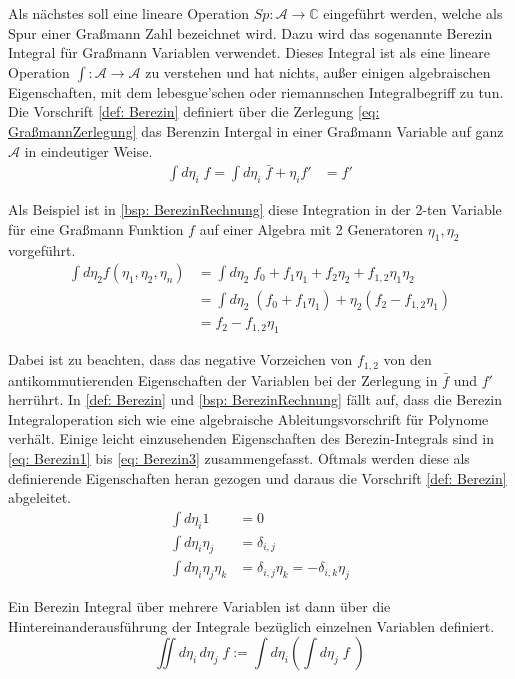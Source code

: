 Als nächstes soll eine lineare Operation $\textit{Sp}:\mathcal A \rightarrow \mathbb C$ eingeführt werden, welche als Spur einer Graßmann Zahl bezeichnet wird. Dazu wird das sogenannte Berezin Integral für Graßmann Variablen verwendet. Dieses Integral ist als eine lineare Operation $\int: \mathcal A \rightarrow \mathcal A$ zu verstehen und hat nichts, außer einigen algebraischen Eigenschaften, mit dem lebesgue'schen oder riemannschen Integralbegriff zu tun. Die Vorschrift \eqref{def: Berezin} definiert über die Zerlegung \eqref{eq: GraßmannZerlegung} das Berenzin Intergal in einer Graßmann Variable auf ganz $\mathcal A$ in eindeutiger Weise.
\begin{align} 
\int d \eta_i \; f = \int d \eta_i \; \bar{f} + \eta_i f' &= f' \label{def: Berezin}
\end{align}

\noindent Als Beispiel ist in \eqref{bsp: BerezinRechnung} diese Integration in der 2-ten Variable für eine Graßmann Funktion $f$ auf einer Algebra mit 2 Generatoren $\eta_1, \eta_2$ vorgeführt.
\begin{align} 
\int d\eta_2 f(\eta_1,\eta_2,\eta_n) &= \int d\eta_2 \; f_0 + f_1 \eta_1 + f_2 \eta_2 + f_{1,2} \eta_1 \eta_2 \nonumber \\
&= \int d\eta_2 \; (f_0 + f_1 \eta_1) + \eta_2 (f_2  - f_{1,2} \eta_1) \nonumber\\
&= f_2  - f_{1,2} \eta_1 \label{bsp: BerezinRechnung}
\end{align}

\noindent Dabei ist zu beachten, dass das negative Vorzeichen von $f_{1,2}$ von den antikommutierenden Eigenschaften der Variablen bei der Zerlegung in $\bar f$ und  $f'$ herrührt. In \eqref{def: Berezin} und \eqref{bsp: BerezinRechnung} fällt auf, dass die Berezin Integraloperation sich wie eine algebraische Ableitungsvorschrift für Polynome verhält. Einige leicht einzusehenden Eigenschaften des Berezin-Integrals sind in \eqref{eq: Berezin1} bis \eqref{eq: Berezin3} zusammengefasst. Oftmals werden diese als definierende Eigenschaften heran gezogen und daraus die Vorschrift \eqref{def: Berezin} abgeleitet. 
\begin{align}
    \int d\eta_i 1 &= 0 \label{eq: Berezin1}\\
    \int d\eta_i \eta_j &= \delta_{i,j} \\
    \int d\eta_i \eta_j \eta_k &=  \delta_{i,j} \eta_k = - \delta_{i,k} \eta_j \label{eq: Berezin3}
\end{align}

\noindent Ein Berezin Integral über mehrere Variablen ist dann über die Hintereinanderausführung der Integrale bezüglich einzelnen Variablen definiert. 
\begin{equation}
\iint d \eta_{i}\, d \eta_{j}\; f := \int d \eta_{i} \left( \int d \eta_{j}\; f\; \right)
\end{equation}

